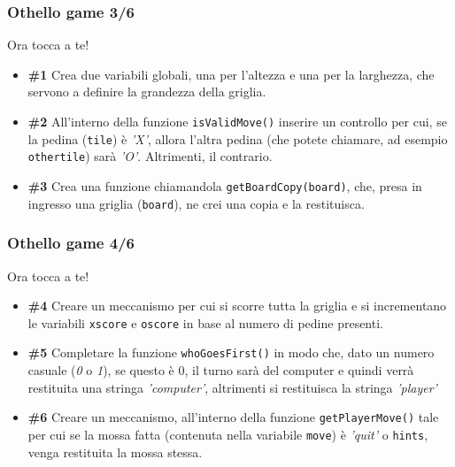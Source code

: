\documentclass{beamer}
\begin{document}
\begin{frame}[fragile]
\frametitle{Othello game 3/6}
\begin{block}{Ora tocca a te!}
	\begin{itemize}
		\item \textbf{\#1} Crea due variabili globali, una per l'altezza e una per la larghezza, che servono a definire la grandezza della griglia.
		\item \textbf{\#2} All'interno della funzione \texttt{isValidMove()} inserire un controllo per cui, se la pedina (\texttt{tile}) è \textit{'X'}, allora l'altra pedina (che potete chiamare, ad esempio \texttt{othertile}) sarà \textit{'O'}. Altrimenti, il contrario.
		\item \textbf{\#3} Crea una funzione chiamandola \texttt{getBoardCopy(board)}, che, presa in ingresso una griglia (\texttt{board}), ne crei una copia e la restituisca.
	\end{itemize}
\end{block}
\end{frame}


\begin{frame}[fragile]
\frametitle{Othello game 4/6}
\begin{block}{Ora tocca a te!}
	\begin{itemize}
		\item \textbf{\#4} Creare un meccanismo per cui si scorre tutta la griglia e si incrementano le variabili \texttt{xscore} e \texttt{oscore} in base al numero di pedine presenti.
		\item \textbf{\#5} Completare la funzione \texttt{whoGoesFirst()} in modo che, dato un numero casuale (\textit{0} o \textit{1}), se questo è 0, il turno sarà del computer e quindi verrà restituita una stringa \textit{'computer'}, altrimenti si restituisca la stringa \textit{'player'}
		\item \textbf{\#6} Creare un meccanismo, all'interno della funzione \texttt{getPlayerMove()} tale per cui se la mossa fatta (contenuta nella variabile \texttt{move}) è \textit{'quit'} o \texttt{hints}, venga restituita la mossa stessa.
	\end{itemize}
\end{block}
\end{frame}
\end{document}
